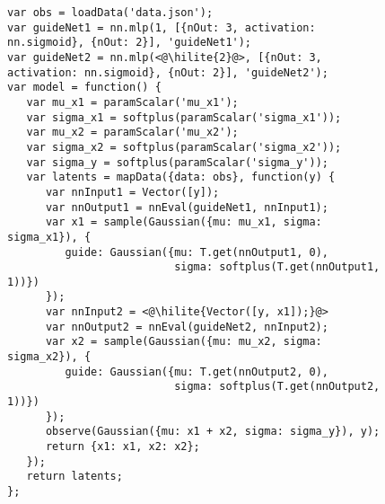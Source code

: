 \begin{figure}
\begin{minipage}{\linewidth}
\begin{minipage}{0.66\linewidth}
\begin{lstlisting}[style=smaller]
var obs = loadData('data.json');
var guideNet1 = nn.mlp(1, [{nOut: 3, activation: nn.sigmoid}, {nOut: 2}], 'guideNet1');
var guideNet2 = nn.mlp(<@\hilite{2}@>, [{nOut: 3, activation: nn.sigmoid}, {nOut: 2}], 'guideNet2');
var model = function() {
   var mu_x1 = paramScalar('mu_x1');
   var sigma_x1 = softplus(paramScalar('sigma_x1'));
   var mu_x2 = paramScalar('mu_x2');
   var sigma_x2 = softplus(paramScalar('sigma_x2'));
   var sigma_y = softplus(paramScalar('sigma_y'));
   var latents = mapData({data: obs}, function(y) {
      var nnInput1 = Vector([y]);
      var nnOutput1 = nnEval(guideNet1, nnInput1);
      var x1 = sample(Gaussian({mu: mu_x1, sigma: sigma_x1}), {
         guide: Gaussian({mu: T.get(nnOutput1, 0),
                          sigma: softplus(T.get(nnOutput1, 1))})
      });
      var nnInput2 = <@\hilite{Vector([y, x1]);}@>
      var nnOutput2 = nnEval(guideNet2, nnInput2);
      var x2 = sample(Gaussian({mu: mu_x2, sigma: sigma_x2}), {
         guide: Gaussian({mu: T.get(nnOutput2, 0),
                          sigma: softplus(T.get(nnOutput2, 1))})
      });
      observe(Gaussian({mu: x1 + x2, sigma: sigma_y}), y);
      return {x1: x1, x2: x2};
   });
   return latents;
};
\end{lstlisting}
\end{minipage}
%
\begin{minipage}{0.33\linewidth}
\begin{flushright}
\end{flushright}
\end{minipage}
\end{minipage}


\end{figure}
